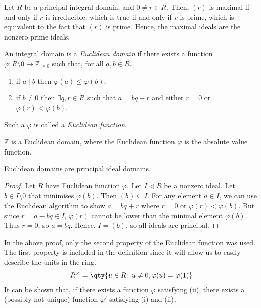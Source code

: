 \begin{remark}
	Let $R$ be a principal integral domain, and $0 \neq r \in R$.
	Then, $(r)$ is maximal if and only if $r$ is irreducible, which is true if and only if $r$ is prime, which is equivalent to the fact that $(r)$ is prime.
	Hence, the maximal ideals are the nonzero prime ideals.
\end{remark}
\begin{definition}
	An integral domain is a \textit{Euclidean domain} if there exists a function $\varphi \colon R \setminus \qty{0} \to \mathbb Z_{\geq 0}$ such that, for all $a, b \in R$.
	\begin{enumerate}
		\item if $a \mid b$ then $\varphi(a) \leq \varphi(b)$;
		\item if $b \neq 0$ then $\exists q, r \in R$ such that $a = bq + r$ and either $r = 0$ or $\varphi(r) < \varphi(b)$.
	\end{enumerate}
	Such a $\varphi$ is called a \textit{Euclidean function}.
\end{definition}
\begin{example}
	$\mathbb Z$ is a Euclidean domain, where the Euclidean function $\varphi$ is the absolute value function.
\end{example}
\begin{proposition}
	Euclidean domains are principal ideal domains.
\end{proposition}
\begin{proof}
	Let $R$ have Euclidean function $\varphi$.
	Let $I \triangleleft R$ be a nonzero ideal.
	Let $b \in I \setminus \qty{0}$ that minimises $\varphi(b)$.
	Then $(b) \subseteq I$.
	For any element $a \in I$, we can use the Euclidean algorithm to show $a = bq + r$ where $r = 0$ or $\varphi(r) < \varphi(b)$.
	But since $r = a - bq \in I$, $\varphi(r)$ cannot be lower than the minimal element $\varphi(b)$.
	Thus $r = 0$, so $a = bq$.
	Hence, $I = (b)$, so all ideals are principal.
\end{proof}
\begin{remark}
	In the above proof, only the second property of the Euclidean function was used.
	The first property is included in the definition since it will allow us to easily describe the units in the ring.
	\begin{align*}
		R^\times = \qty{u \in R \colon u \neq 0, \varphi(u) = \varphi(1)}
	\end{align*}
	It can be shown that, if there exists a function $\varphi$ satisfying (ii), there exists a (possibly not unique) function $\varphi'$ satisfying (i) and (ii).
\end{remark}
